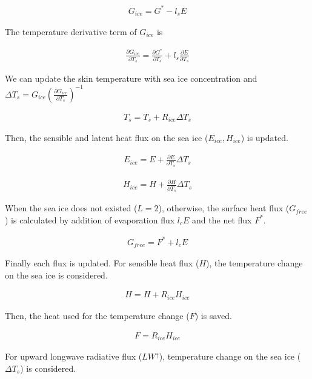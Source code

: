 \begin{eqnarray}
    G_{ice} = G^* - l_s E
\end{eqnarray}

The temperature derivative term of \(G_{ice}\) is

\begin{eqnarray}
    \frac{\partial G_{ice}}{\partial T_s}=\frac{\partial G^*}{\partial T_s} + l_s\frac{\partial E}{\partial T_s}
\end{eqnarray}

We can update the skin temperature with sea ice concentration and \(\Delta T_s=G_{ice} ( \frac{\partial G_{ice}}{\partial T_s})^{-1}\)

\begin{eqnarray}
    T_s = T_s +R_{ice} \Delta T_s
\end{eqnarray}

Then, the sensible and latent heat flux on the sea ice (\(E_{ice},H_{ice}\)) is updated.

\begin{eqnarray}
    E_{ice} = E + \frac{\partial E}{\partial T_s}\Delta T_s
\end{eqnarray}

\begin{eqnarray}
    H_{ice} = H + \frac{\partial H}{\partial T_s}\Delta T_s
\end{eqnarray}

When the sea ice does not existed (\(L=2\)), otherwise, the surface heat flux (\(G_{free}\)) is calculated by addition of evaporation flux \(l_cE\) and the net flux \(F^\ast\).

\begin{eqnarray}
    G_{free}=F^\ast + l_cE
\end{eqnarray}

Finally each flux is updated. For sensible heat flux (\(H\)), the temperature change on the sea ice is considered.

\begin{eqnarray}
    H=H+ R_{ice}  H_{ice}
\end{eqnarray}

Then, the heat used for the temperature change (\(F\)) is saved.

\begin{eqnarray}
    F = R_{ice} H_{ice}
\end{eqnarray}

For upward longwave radiative flux (\(LW^\uparrow\)), temperature change on the sea ice (\(\Delta T_s\)) is considered.

